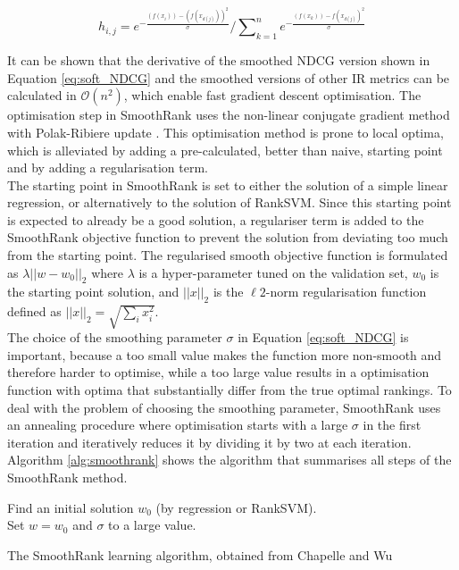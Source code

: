 \begin{equation}
h_{i,j} = e^{-\frac{(f(x_i))-(f(x_{d(j)}))^2}{\sigma}}\Big/\sum\nolimits_{k=1}^{n}e^{-\frac{(f(x_k))-f(x_{d(j)})^2}{\sigma}}
\label{eq:soft_NDCG}
\end{equation}

It can be shown that the derivative of the smoothed \ac{NDCG} version shown in Equation \ref{eq:soft_NDCG} and the smoothed versions of other \ac{IR} metrics can be calculated in $\mathcal{O}(n^2)$, which enable fast gradient descent optimisation. The optimisation step in SmoothRank uses the non-linear conjugate gradient method  with Polak-Ribiere update \cite{Shewchuk1994}. This optimisation method is prone to local optima, which is alleviated by adding a pre-calculated, better than naive, starting point and by adding a regularisation term.\\

The starting point in SmoothRank is set to either the solution of a simple linear regression, or alternatively to the solution of Rank\acs{SVM}. Since this starting point is expected to already be a good solution, a regulariser term is added to the SmoothRank objective function to prevent the solution from deviating too much from the starting point. The regularised smooth objective function is formulated as $\lambda||w-w_0||_2$ where $\lambda$ is a hyper-parameter tuned on the validation set, $w_0$ is the starting point solution, and $||x||_2$ is the $\ell2$-norm regularisation function defined as $||x||_2 = \sqrt{\sum\nolimits_ix_i^2}$.\\

The choice of the smoothing parameter $\sigma$ in Equation \ref{eq:soft_NDCG} is important, because a too small value makes the function more non-smooth and therefore harder to optimise, while a too large value results in a optimisation function with optima that substantially differ from the true optimal rankings. To deal with the problem of choosing the smoothing parameter, SmoothRank uses an annealing procedure where optimisation starts with a large $\sigma$ in the first iteration and iteratively reduces it by dividing it by two at each iteration. Algorithm \ref{alg:smoothrank} shows the algorithm that summarises all steps of the SmoothRank method.\\

\LinesNumbered
\begin{algorithm}[H]
 Find an initial solution $w_0$ (by regression or Rank\acs{SVM}).\\
 Set $w = w_0$ and $\sigma$ to a large value.\\
 \caption{The SmoothRank learning algorithm, obtained from Chapelle and Wu \cite{Chapelle2010}}
 \label{alg:smoothrank}
\end{algorithm}

